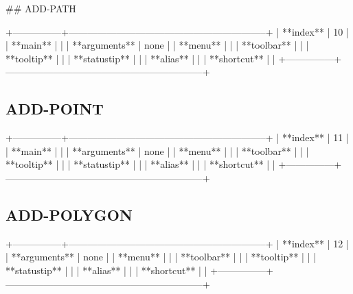 ## ADD-PATH

+---------------+--------------------------------------------------------------+
| **index**     | 10                                                           |
| **main**      |                                                              |
| **arguments** | none                                                         |
| **menu**      |                                                              |
| **toolbar**   |                                                              |
| **tooltip**   |                                                              |
| **statustip** |                                                              |
| **alias**     |                                                              |
| **shortcut**  |                                                              |
+---------------+--------------------------------------------------------------+

\subsection{ADD-POINT}

+---------------+--------------------------------------------------------------+
| **index**     | 11                                                           |
| **main**      |                                                              |
| **arguments** | none                                                         |
| **menu**      |                                                              |
| **toolbar**   |                                                              |
| **tooltip**   |                                                              |
| **statustip** |                                                              |
| **alias**     |                                                              |
| **shortcut**  |                                                              |
+---------------+--------------------------------------------------------------+

\subsection{ADD-POLYGON}

+---------------+--------------------------------------------------------------+
| **index**     | 12                                                           |
| **arguments** | none                                                         |
| **menu**      |                                                              |
| **toolbar**   |                                                              |
| **tooltip**   |                                                              |
| **statustip** |                                                              |
| **alias**     |                                                              |
| **shortcut**  |                                                              |
+---------------+--------------------------------------------------------------+


